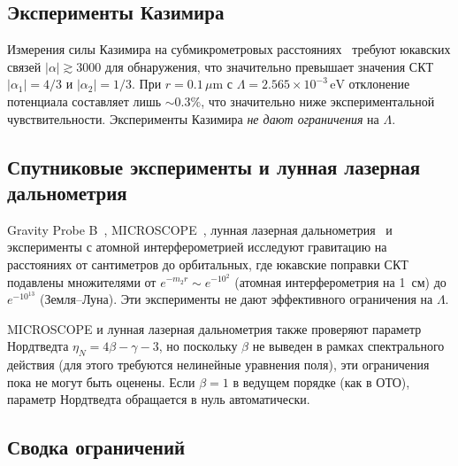 \documentclass[aps,prd,twocolumn,superscriptaddress,nofootinbib,floatfix]{revtex4-2}
\begin{document}
\subsection{Эксперименты Казимира}

Измерения силы Казимира на субмикрометровых
расстояниях~\cite{Decca:2007,Chen:2016} требуют юкавских связей
$|\alpha| \gtrsim 3000$ для обнаружения, что значительно превышает
значения СКТ $|\alpha_1| = 4/3$ и $|\alpha_2| = 1/3$. При
$r = 0.1\,\mu\mathrm{m}$ с
$\Lambda = 2.565 \times 10^{-3}\,\mathrm{eV}$ отклонение потенциала
составляет лишь $\sim 0.3\%$, что значительно ниже
экспериментальной чувствительности. Эксперименты Казимира
\emph{не дают ограничения} на $\Lambda$.

\subsection{Спутниковые эксперименты и лунная лазерная дальнометрия}

Gravity Probe B~\cite{Everitt:2011}, MICROSCOPE~\cite{Touboul:2022},
лунная лазерная дальнометрия~\cite{Williams:2004} и эксперименты
с атомной интерферометрией исследуют гравитацию на расстояниях от
сантиметров до орбитальных, где юкавские поправки СКТ подавлены
множителями от $e^{-m_2 r} \sim e^{-10^{2}}$ (атомная
интерферометрия на 1~см) до $e^{-10^{13}}$ (Земля--Луна).
Эти эксперименты не дают эффективного ограничения на $\Lambda$.

MICROSCOPE и лунная лазерная дальнометрия также проверяют
параметр Нордтведта $\eta_N = 4\beta - \gamma - 3$, но поскольку
$\beta$ не выведен в рамках спектрального действия (для этого
требуются нелинейные уравнения поля), эти ограничения пока не могут
быть оценены. Если $\beta = 1$ в ведущем порядке (как в ОТО),
параметр Нордтведта обращается в нуль автоматически.

\subsection{Сводка ограничений}
\end{document}
